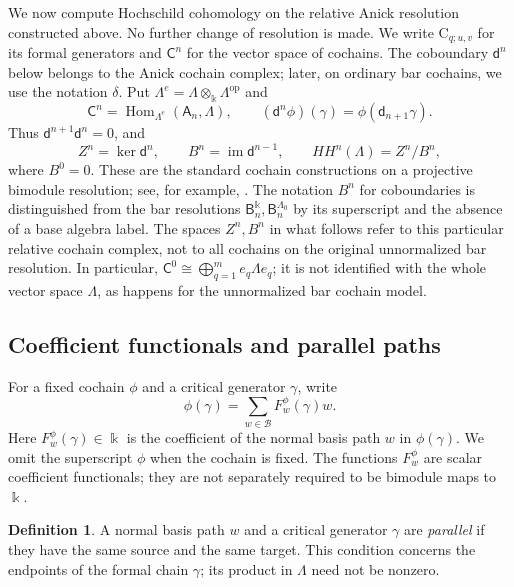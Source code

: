 \documentclass[a4paper,11pt,oneside,reqno]{amsart}
\theoremstyle{definition}
\newtheorem{definition}[theorem]{Definition}
\numberwithin{equation}{section}
\begin{document}
	We now compute Hochschild cohomology on the relative Anick resolution
	constructed above.  No further change of resolution is made.
	We write $\mathrm{C}_{q;u,v}$ for its formal generators and
	$\mathsf C^n$ for the vector space of cochains. The coboundary
	$\mathsf d^n$ below belongs to the Anick cochain complex; later,
	on ordinary bar cochains, we use the notation $\delta$. Put
	$\Lambda^e=\Lambda\otimes_{\Bbbk}\Lambda^{\mathrm{op}}$ and
	\begin{equation}\label{eq:cochain-complex}
		\mathsf C^n=\operatorname{Hom}_{\Lambda^e}(\mathsf A_n,\Lambda),\qquad
		(\mathsf d^n\phi)(\gamma)=\phi(\mathsf d_{n+1}\gamma).
	\end{equation}
	Thus $\mathsf d^{n+1}\mathsf d^n=0$, and
	\begin{equation}\label{eq:HH-definition}
		Z^n=\ker\mathsf d^n,\qquad B^n=\operatorname{im}\mathsf d^{n-1},\qquad
		HH^n(\Lambda)=Z^n/B^n,
	\end{equation}
	where $B^0=0$.  These are the standard cochain constructions on a
	projective bimodule resolution; see, for example, \cite[Section~2]{Volkov}.
	The notation $B^n$ for coboundaries is distinguished from the bar
	resolutions $\mathsf B_n^{\Bbbk},\mathsf B_n^{\Lambda_0}$ by its superscript and the absence of a base
	algebra label.  The spaces $Z^n,B^n$ in what follows refer to this
	particular relative cochain complex, not to all cochains on the original
	unnormalized bar resolution.
	In particular, $\mathsf C^0\cong\bigoplus_{q=1}^m e_q\Lambda e_q$;
	it is not identified with the whole vector space $\Lambda$,
	as happens for the unnormalized bar cochain model.
	
	\subsection{Coefficient functionals and parallel paths}
	
	For a fixed cochain $\phi$ and a critical generator $\gamma$, write
	\begin{equation}\label{eq:functional-expansion}
		\phi(\gamma)=\sum_{w\in\mathcal B}F_w^\phi(\gamma)w.
	\end{equation}
	Here $F_w^\phi(\gamma)\in \Bbbk$ is the coefficient of the normal basis path $w$
	in $\phi(\gamma)$.  We omit the superscript $\phi$ when the cochain is fixed.
	The functions $F_w^\phi$ are scalar coefficient functionals; they are
	not separately required to be bimodule maps to $\Bbbk$.
	
	\begin{definition}\label{def:parallel}
		A normal basis path $w$ and a critical generator $\gamma$ are \emph{parallel}
		if they have the same source and the same target.  This condition concerns
		the endpoints of the formal chain $\gamma$; its product in $\Lambda$ need not
		be nonzero.
	\end{definition}
	
\end{document}
